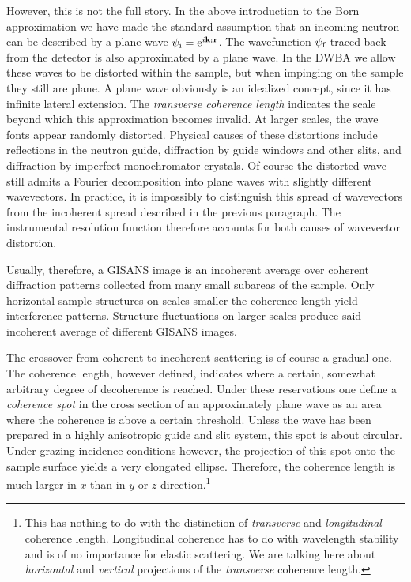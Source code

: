 However, this is not the full story.
In the above introduction to the Born approximation
we have made the standard assumption
that an incoming neutron can be described by a plane wave
$\psi_{\text{i}}=\text{e}^{i\mathbf{k}_{\text{i}}\mathbf{r}}$.
The wavefunction $\psi_{\text{f}}$ traced back from the detector is also
approximated by a plane wave.
In the DWBA we allow these waves to be distorted within the sample,
but when impinging on the sample they still are plane.
A plane wave obviously is an idealized concept,
since it has infinite lateral extension.
The \textit{transverse coherence length} indicates the scale
beyond which this approximation becomes invalid.
At larger scales, the wave fonts appear randomly distorted.
Physical causes of these distortions include
reflections in the neutron guide,
diffraction by guide windows and other slits,
and diffraction by imperfect monochromator crystals.
Of course the distorted wave still admits a Fourier decomposition
into plane waves with slightly different wavevectors.
In practice, it is impossibly to distinguish this spread of wavevectors
from the incoherent spread described in the previous paragraph.
The instrumental resolution function therefore
accounts for both causes of wavevector distortion.
%

Usually, therefore, a GISANS image is an incoherent average
over coherent diffraction patterns collected from 
many small subareas of the sample.
Only horizontal sample structures on scales smaller the coherence length
yield interference patterns.
Structure fluctuations on larger scales
produce said incoherent average of different GISANS images.

The crossover from coherent to incoherent scattering is of course
a gradual one.
The coherence length, however defined,
indicates where a certain, somewhat arbitrary degree
of decoherence is reached.
Under these reservations
one define a \textit{coherence spot}
in the cross section of an approximately plane wave
as an area where the coherence is above a certain threshold.
Unless the wave has been prepared in a highly anisotropic guide and slit system,
this spot is about circular.
Under grazing incidence conditions however,
the projection of this spot onto the sample surface
yields a very elongated ellipse.
Therefore, the coherence length is much larger in $x$ than
in $y$ or $z$ direction.\footnote
{This has nothing to do with the distinction of
  \textit{transverse} and \textit{longitudinal} coherence length.
  Longitudinal coherence has to do with wavelength stability
  and is of no importance for elastic scattering.
  We are talking here about \textit{horizontal} and \textit{vertical}
  projections of the \textit{transverse} coherence length.}

